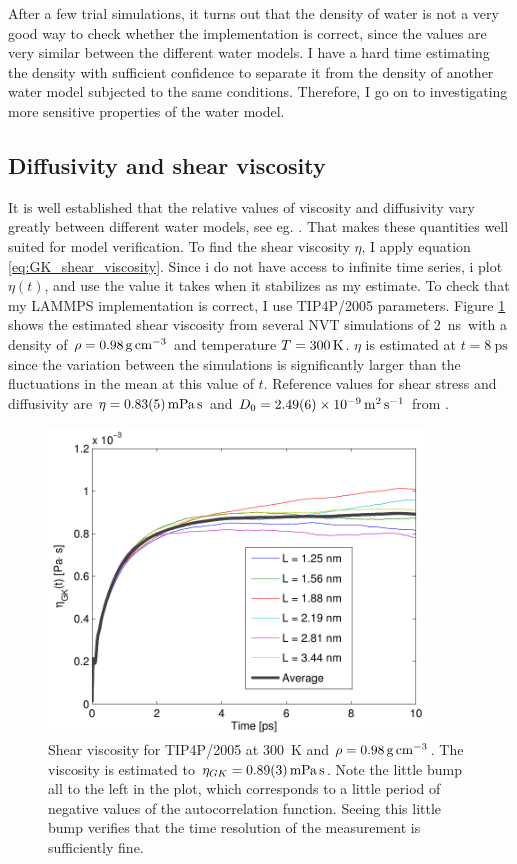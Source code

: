 After a few trial simulations, it turns out that the density of water is not a very good way to check whether the implementation is correct, since the values are very similar between the different water models. I have a hard time estimating the density with sufficient confidence to separate it from the density of another water model subjected to the same conditions. Therefore, I go on to investigating more sensitive properties of the water model.

\subsection{Diffusivity and shear viscosity}
It is well established that the relative values of viscosity and diffusivity vary greatly between different water models, see eg. \cite{Gonzalez2010,Tazi2012}. That makes these quantities well suited for model verification. To find the shear viscosity $\eta$, I apply equation \ref{eq:GK_shear_viscosity}. Since i do not have access to infinite time series, i plot $\eta(t)$, and use the value it takes when it stabilizes as my estimate. To check that my LAMMPS implementation is correct, I use TIP4P/2005 parameters.  Figure \ref{fig:shear_viscosity_tip4p/2005} shows the estimated shear viscosity from several NVT simulations of \SI{2}{\nano\second} with a density of $\rho = \text{\SI{0.98}{\gram\per\cubic\cm}}$ and temperature $T=\text{\SI{300}{\kelvin}}$. $\eta$ is estimated at $t = \SI{8}{\pico\second}$ since the variation between the simulations is significantly larger than the fluctuations in the mean at this value of $t$. Reference values for shear stress and diffusivity are $\eta = \text{\SI{0.83 \pm 0.05}{\milli\pascal\second}}$ and $D_0 = \text{\SI{2.49 \pm 0.06d-9}{\metre\squared\per\second}}$ from \cite{Tazi2012}.

\begin{figure}
\centering
\includegraphics[width=10cm]{../figures/thesis/viscosity_green_kubo_tip4p_2005.pdf}
\caption{Shear viscosity for TIP4P/2005 at \SI{300}{\kelvin} and $\rho = \text{\SI{0.98}{\gram\per\cubic\cm}}$. The viscosity is estimated to $\eta_{GK} = \text{\SI{0.89\pm0.03}{\milli\pascal\second}}$. Note the little bump all to the left in the plot, which corresponds to a little period of negative values of the autocorrelation function. Seeing this little bump verifies that the time resolution of the measurement is sufficiently fine.}
\label{fig:shear_viscosity_tip4p/2005}
\end{figure}

